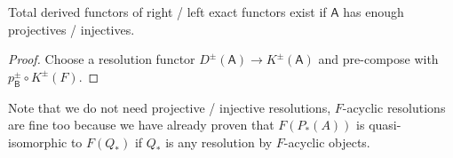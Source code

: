 \documentclass[fontsize=11pt,fleqn,a4paper]{scrartcl}
\begin{document}
\begin{theorem}
Total derived functors of right / left exact functors exist if $\mathsf{A}$ has enough projectives / injectives.
\end{theorem}
\begin{proof}
Choose a resolution functor $D^\pm(\mathsf{A}) \to K^\pm(\mathsf{A})$ and pre-compose with $p_\mathsf{B}^\pm\circ K^\pm(F)$.
\end{proof}

\begin{remark}
Note that we do not need projective / injective resolutions, $F$-acyclic resolutions are fine too because we have already proven that $F(P_\ast(A))$ is quasi-isomorphic to $F(Q_\ast)$ if $Q_\ast$ is any resolution by $F$-acyclic objects.
\end{remark}
\end{document}
